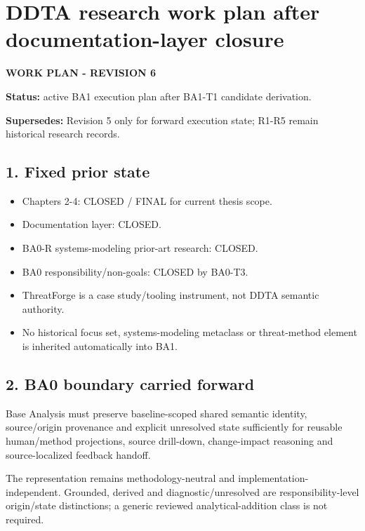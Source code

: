 \documentclass[
]{article}
\author{}
\date{}
\providecommand{\tightlist}{%
  \setlength{\itemsep}{0pt}\setlength{\parskip}{0pt}}
\begin{document}
\section{DDTA research work plan after documentation-layer
closure}\label{ddta-research-work-plan-after-documentation-layer-closure}

\textbf{WORK PLAN - REVISION 6}

\textbf{Status:} active BA1 execution plan after BA1-T1 candidate
derivation.

\textbf{Supersedes:} Revision 5 only for forward execution state; R1-R5
remain historical research records.

\subsection{1. Fixed prior state}\label{1-fixed-prior-state}

\begin{itemize}
\tightlist
\item
  Chapters 2-4: CLOSED / FINAL for current thesis scope.
\item
  Documentation layer: CLOSED.
\item
  BA0-R systems-modeling prior-art research: CLOSED.
\item
  BA0 responsibility/non-goals: CLOSED by BA0-T3.
\item
  ThreatForge is a case study/tooling instrument, not DDTA semantic
  authority.
\item
  No historical focus set, systems-modeling metaclass or threat-method
  element is inherited automatically into BA1.
\end{itemize}

\subsection{2. BA0 boundary carried
forward}\label{2-ba0-boundary-carried-forward}

Base Analysis must preserve baseline-scoped shared semantic identity,
source/origin provenance and explicit unresolved state sufficiently for
reusable human/method projections, source drill-down, change-impact
reasoning and source-localized feedback handoff.

The representation remains methodology-neutral and
implementation-independent. Grounded, derived and diagnostic/unresolved
are responsibility-level origin/state distinctions; a generic reviewed
analytical-addition class is not required.
\end{document}
